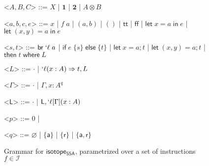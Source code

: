 \documentclass[acmsmall,screen,review]{acmart}
\newcommand{\mc}[1]{\ensuremath{\mathcal{#1}}}
\newcommand{\ms}[1]{\ensuremath{\mathsf{#1}}}
\newcommand{\lbl}[1]{{`#1}}
\newcommand{\lto}{\Rightarrow}
\newcommand{\ctt}{\ms{tt}}
\newcommand{\cff}{\ms{ff}}
\newcommand{\letexpr}[3]{\ensuremath{\ms{let}\;#1 = #2\;\ms{in}\;#3}}
\newcommand{\letstmt}[3]{\ensuremath{\ms{let}\;#1 = #2; #3}}
\newcommand{\brb}[2]{\ms{br}\;#1\;#2}
\newcommand{\lbrb}[2]{\brb{\lbl{#1}}{#2}}
\newcommand{\ite}[3]{\ms{if}\;#1\;\{#2\}\;\ms{else}\;\{#3\}}
\newcommand{\ewhere}[2]{\ms{then}\;#1\;\ms{where}\;#2}
\newcommand{\wbranch}[3]{#1(#2) \lto #3}
\newcommand{\lwbranch}[3]{\wbranch{\lbl{#1}}{#2}{#3}}
\newcommand{\cwk}[2]{#1 \mapsto #2}
\newcommand{\lwk}[2]{#1 \rightsquigarrow #2}
\newcommand{\thyp}[3]{#1: {#2}^{#3}}
\newcommand{\taff}{{\{\ms{a}\}}}
\newcommand{\trel}{{\{\ms{r}\}}}
\newcommand{\tint}{{\{\ms{a}, \ms{r}\}}}
\newcommand{\hasty}[5]{#1 \vdash_{#2} #3: {#4}^{#5}}
\newcommand{\haslb}[3]{#1 \vdash #2 \rhd #3}
\newcommand{\isotopessa}{\ms{isotope_{SSA}}}
\begin{document}



\clearpage 

\appendix

\begin{figure}
  \begin{center}
    \begin{grammar}
      <\(A, B, C\)> ::= 
      \(X\)
      \;|\; \(\mathbf{1}\)
      \;|\; \(\mathbf{2}\)
      \;|\; \(A \otimes B\)

      <\(a, b, c, e\)> ::= \(x\) 
      \;|\; \(f\;a\)
      \;|\; \((a, b)\) 
      \;|\; \(()\) 
      \;|\; \(\ctt\) 
      \;|\; \(\cff\)
      \;|\; \(\letexpr{x}{a}{e}\)
      \;|\; \(\letexpr{(x, y)}{a}{e}\)
      
      <\(s, t\)> ::= \(\lbrb{\ell}{a}\) 
      \;|\; \(\ite{e}{s}{t}\)
      \;|\; \(\letstmt{x}{a}{t}\)
      \;|\; \(\letstmt{(x, y)}{a}{t}\)
      \;|\; \(\ewhere{t}{L}\)

      <\(L\)> ::= \(\cdot\) \;|\; \(\lwbranch{\ell}{x: A}{t}, L\)

      <\(\Gamma\)> ::= \(\cdot\) \;|\; \(\Gamma, \thyp{x}{A}{q}\)

      <\(\ms{L}\)> ::= \(\cdot\) \;|\; \(\ms{L}, \lbl{\ell}[\Gamma](x: A)\)

      <\(p\)> ::= 0 \;|

      <\(q\)> ::= \(\varnothing\) 
      \;|\; \(\taff\) 
      \;|\; \(\trel\) 
      \;|\; \(\tint\)
    \end{grammar}
  \end{center}
  \caption{Grammar for \isotopessa, parametrized over a set of instructions \(f \in \mc{I}\)}
  \label{fig:ssa-grammar}
\end{figure}



\end{document}
